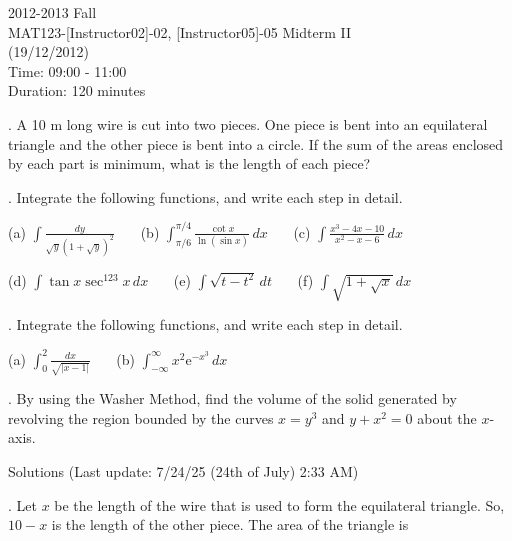 \documentclass{article}
\begin{document}
\large

\begin{center}
2012-2013 Fall \\MAT123-[Instructor02]-02, [Instructor05]-05 Midterm II\\(19/12/2012)\\Time: 09:00 - 11:00\\Duration: 120 minutes
\end{center}

. A 10 m long wire is cut into two pieces. One piece is bent into an equilateral triangle and the other piece is bent into a circle. If the sum of the areas enclosed by each part is minimum, what is the length of each piece?

\hfill

. Integrate the following functions, and write each step in detail.

\hfill

(a) $\displaystyle\int\frac{dy}{\sqrt{y}\left(1+\sqrt y\right)^2}$ \ \ \ (b) $\displaystyle\int_{\pi/6}^{\pi/4}\frac{\cot x}{\ln(\sin x)}\,dx$ \ \ \ (c) $\displaystyle\int\frac{x^3-4x-10}{x^2-x-6}\,dx$

\hfill

(d) $\displaystyle \int\tan x \sec^{123}x\,dx$ \ \ \ (e) $\displaystyle\int\sqrt{t-t^2}\,dt$ \ \ \ (f) $\displaystyle\int\sqrt{1+\sqrt x}\,dx$

\hfill

. Integrate the following functions, and write each step in detail.

\hfill

(a) $\displaystyle \int_0^2\frac{dx}{\sqrt{|x-1|}}$ \ \ \ (b) $\displaystyle\int_{-\infty}^{\infty}x^2\mathrm{e}^{-x^3}\,dx$

\hfill

. By using the Washer Method, find the volume of the solid generated by revolving the region bounded by the curves $x=y^3$ and $y+x^2=0$ about the $x$-axis.

\hfill

\newpage

\begin{center}
Solutions (Last update: 7/24/25 (24th of July) 2:33 AM)
\end{center}

. Let $x$ be the length of the wire that is used to form the equilateral triangle. So, $10-x$ is the length of the other piece. The area of the triangle is
\end{document}
